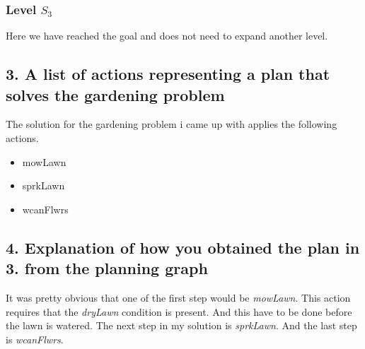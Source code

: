 \documentclass{article}
\begin{document}
	\subsubsection*{Level $S_3$}
		Here we have reached the goal and does not need to expand another level.
\newpage
\subsection*{3. A list of actions representing a plan that solves the gardening problem}
	The solution for the gardening problem i came up with applies the following actions.
	\begin{itemize}
		\item mowLawn
		\item sprkLawn
		\item wcanFlwrs
	\end{itemize}
\subsection*{4. Explanation of how you obtained the plan in 3. from the planning graph}
	It was pretty obvious that one of the first step would be \textit{mowLawn}. This action requires that the \textit{dryLawn} condition is present. And this have to be done before the lawn is watered. The next step in my solution is \textit{sprkLawn}. And the last step is \textit{wcanFlwrs}.
\end{document}
